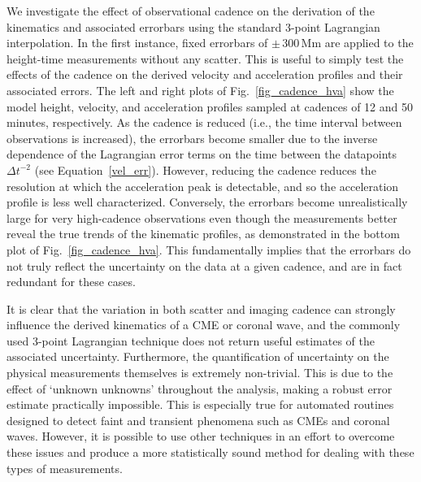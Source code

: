 \documentclass[structabstract]{aa}
\begin{document}
We investigate the effect of observational cadence on the derivation of the kinematics and associated errorbars using the standard 3-point Lagrangian interpolation. In the first instance, fixed errorbars of $\pm\,300$\,Mm are applied to the height-time measurements without any scatter. This is useful to simply test the effects of the cadence on the derived velocity and acceleration profiles and their associated errors. The left and right plots of Fig.~\ref{fig_cadence_hva} show the model height, velocity, and acceleration profiles sampled at cadences of 12 and 50\,minutes, respectively. As the cadence is reduced (i.e., the time interval between observations is increased), the errorbars become smaller due to the inverse dependence of the Lagrangian error terms on the time between the datapoints $\Delta t^{-2}$ (see Equation~\ref{vel_err}). However, reducing the cadence reduces the resolution at which the acceleration peak is detectable, and so the acceleration profile is less well characterized. Conversely, the errorbars become unrealistically large for very high-cadence observations even though the measurements better reveal the true trends of the kinematic profiles, as demonstrated in the bottom plot of Fig.~\ref{fig_cadence_hva}. This fundamentally implies that the errorbars do not truly reflect the uncertainty on the data at a given cadence, and are in fact redundant for these cases.



It is clear that the variation in both scatter and imaging cadence can strongly influence the derived kinematics of a CME or coronal wave, and the commonly used 3-point Lagrangian technique does not return useful estimates of the associated uncertainty. Furthermore, the quantification of uncertainty on the physical measurements themselves is extremely non-trivial. This is due to the effect of `unknown unknowns' throughout the analysis, making a robust error estimate practically impossible. This is especially true for automated routines designed to detect faint and transient phenomena such as CMEs and coronal waves. However, it is possible to use other techniques in an effort to overcome these issues and produce a more statistically sound method for dealing with these types of measurements.
\end{document}
